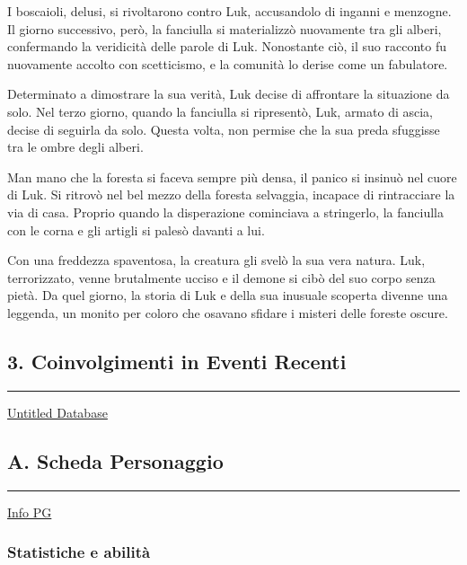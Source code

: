 I boscaioli, delusi, si rivoltarono contro Luk, accusandolo di inganni e
menzogne. Il giorno successivo, però, la fanciulla si materializzò
nuovamente tra gli alberi, confermando la veridicità delle parole di
Luk. Nonostante ciò, il suo racconto fu nuovamente accolto con
scetticismo, e la comunità lo derise come un fabulatore.

Determinato a dimostrare la sua verità, Luk decise di affrontare la
situazione da solo. Nel terzo giorno, quando la fanciulla si ripresentò,
Luk, armato di ascia, decise di seguirla da solo. Questa volta, non
permise che la sua preda sfuggisse tra le ombre degli alberi.

Man mano che la foresta si faceva sempre più densa, il panico si insinuò
nel cuore di Luk. Si ritrovò nel bel mezzo della foresta selvaggia,
incapace di rintracciare la via di casa. Proprio quando la disperazione
cominciava a stringerlo, la fanciulla con le corna e gli artigli si
palesò davanti a lui.

Con una freddezza spaventosa, la creatura gli svelò la sua vera natura.
Luk, terrorizzato, venne brutalmente ucciso e il demone si cibò del suo
corpo senza pietà. Da quel giorno, la storia di Luk e della sua inusuale
scoperta divenne una leggenda, un monito per coloro che osavano sfidare
i misteri delle foreste oscure.

\subsection{3. Coinvolgimenti in Eventi
Recenti}\label{coinvolgimenti-in-eventi-recenti}

\begin{center}\rule{0.5\linewidth}{0.5pt}\end{center}

\href{Untitled\%20Database\%20f4f70c0cf72f46ecb12f8c8b3a15302c.csv}{Untitled
Database}

\subsection{A. Scheda Personaggio}\label{a.-scheda-personaggio}

\begin{center}\rule{0.5\linewidth}{0.5pt}\end{center}

\href{Info\%20PG\%20671ef2a33d454743bb2b7f3bb59c3144.csv}{Info PG}

\subsubsection{Statistiche e abilità}\label{statistiche-e-abilituxe0}

